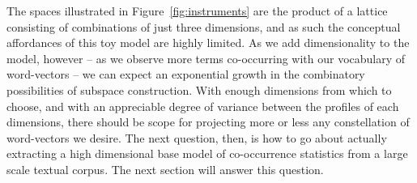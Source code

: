 {The spaces illustrated in Figure~\ref{fig:instruments} are the product of a lattice consisting of combinations of just three dimensions, and as such the conceptual affordances of this toy model are highly limited.  As we add dimensionality to the model, however -- as we observe more terms co-occurring with our vocabulary of word-vectors -- we can expect an exponential growth in the combinatory possibilities of subspace construction.  With enough dimensions from which to choose, and with an appreciable degree of variance between the profiles of each dimensions, there should be scope for projecting more or less any constellation of word-vectors we desire.  The next question, then, is how to go about actually extracting a high dimensional base model of co-occurrence statistics from a large scale textual corpus.  The next section will answer this question.




}
